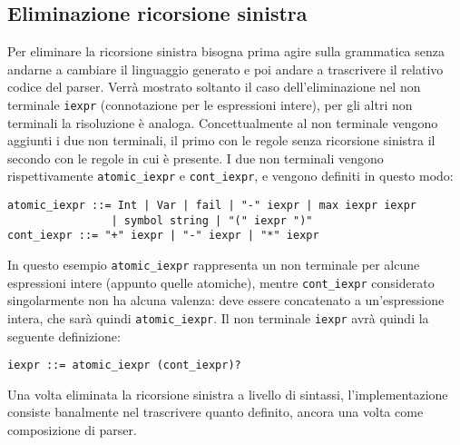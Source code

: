 \documentclass[]{article}
\begin{document}
\hypertarget{eliminazione-ricorsione-sinistra}{%
\subsection{Eliminazione ricorsione
sinistra}\label{eliminazione-ricorsione-sinistra}}

Per eliminare la ricorsione sinistra bisogna prima agire sulla
grammatica senza andarne a cambiare il linguaggio generato e poi andare
a trascrivere il relativo codice del parser. Verrà mostrato soltanto il
caso dell'eliminazione nel non terminale \texttt{iexpr} (connotazione
per le espressioni intere), per gli altri non terminali la risoluzione è
analoga. Concettualmente al non terminale vengono aggiunti i due non
terminali, il primo con le regole senza ricorsione sinistra il secondo
con le regole in cui è presente. I due non terminali vengono
rispettivamente \texttt{atomic\_iexpr} e \texttt{cont\_iexpr}, e vengono
definiti in questo modo:

\begin{verbatim}
atomic_iexpr ::= Int | Var | fail | "-" iexpr | max iexpr iexpr 
                | symbol string | "(" iexpr ")"
cont_iexpr ::= "+" iexpr | "-" iexpr | "*" iexpr 
\end{verbatim}

In questo esempio \texttt{atomic\_iexpr} rappresenta un non terminale
per alcune espressioni intere (appunto quelle atomiche), mentre
\texttt{cont\_iexpr} considerato singolarmente non ha alcuna valenza:
deve essere concatenato a un'espressione intera, che sarà quindi
\texttt{atomic\_iexpr}. Il non terminale \texttt{iexpr} avrà quindi la
seguente definizione:

\begin{verbatim}
iexpr ::= atomic_iexpr (cont_iexpr)?
\end{verbatim}

Una volta eliminata la ricorsione sinistra a livello di sintassi,
l'implementazione consiste banalmente nel trascrivere quanto definito,
ancora una volta come composizione di parser.
\end{document}
